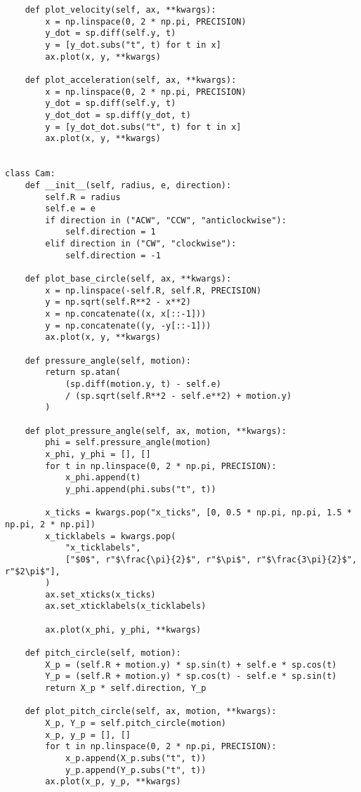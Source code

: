 \documentclass[12pt]{article}
\begin{document}
\begin{lstlisting}
    def plot_velocity(self, ax, **kwargs):
        x = np.linspace(0, 2 * np.pi, PRECISION)
        y_dot = sp.diff(self.y, t)
        y = [y_dot.subs("t", t) for t in x]
        ax.plot(x, y, **kwargs)

    def plot_acceleration(self, ax, **kwargs):
        x = np.linspace(0, 2 * np.pi, PRECISION)
        y_dot = sp.diff(self.y, t)
        y_dot_dot = sp.diff(y_dot, t)
        y = [y_dot_dot.subs("t", t) for t in x]
        ax.plot(x, y, **kwargs)


class Cam:
    def __init__(self, radius, e, direction):
        self.R = radius
        self.e = e
        if direction in ("ACW", "CCW", "anticlockwise"):
            self.direction = 1
        elif direction in ("CW", "clockwise"):
            self.direction = -1

    def plot_base_circle(self, ax, **kwargs):
        x = np.linspace(-self.R, self.R, PRECISION)
        y = np.sqrt(self.R**2 - x**2)
        x = np.concatenate((x, x[::-1]))
        y = np.concatenate((y, -y[::-1]))
        ax.plot(x, y, **kwargs)

    def pressure_angle(self, motion):
        return sp.atan(
            (sp.diff(motion.y, t) - self.e)
            / (sp.sqrt(self.R**2 - self.e**2) + motion.y)
        )

    def plot_pressure_angle(self, ax, motion, **kwargs):
        phi = self.pressure_angle(motion)
        x_phi, y_phi = [], []
        for t in np.linspace(0, 2 * np.pi, PRECISION):
            x_phi.append(t)
            y_phi.append(phi.subs("t", t))

        x_ticks = kwargs.pop("x_ticks", [0, 0.5 * np.pi, np.pi, 1.5 * np.pi, 2 * np.pi])
        x_ticklabels = kwargs.pop(
            "x_ticklabels",
            ["$0$", r"$\frac{\pi}{2}$", r"$\pi$", r"$\frac{3\pi}{2}$", r"$2\pi$"],
        )
        ax.set_xticks(x_ticks)
        ax.set_xticklabels(x_ticklabels)

        ax.plot(x_phi, y_phi, **kwargs)

    def pitch_circle(self, motion):
        X_p = (self.R + motion.y) * sp.sin(t) + self.e * sp.cos(t)
        Y_p = (self.R + motion.y) * sp.cos(t) - self.e * sp.sin(t)
        return X_p * self.direction, Y_p

    def plot_pitch_circle(self, ax, motion, **kwargs):
        X_p, Y_p = self.pitch_circle(motion)
        x_p, y_p = [], []
        for t in np.linspace(0, 2 * np.pi, PRECISION):
            x_p.append(X_p.subs("t", t))
            y_p.append(Y_p.subs("t", t))
        ax.plot(x_p, y_p, **kwargs)



\end{lstlisting}
\end{document}
